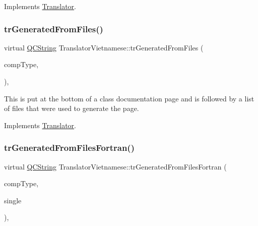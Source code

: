 Implements \mbox{\hyperlink{class_translator}{Translator}}.

\mbox{\label{class_translator_vietnamese_a410ae6f502f7025da6648e3f384e84bd}} 
\subsubsection{\texorpdfstring{trGeneratedFromFiles()}{trGeneratedFromFiles()}}
{\footnotesize\ttfamily virtual \mbox{\hyperlink{class_q_c_string}{Q\+C\+String}} Translator\+Vietnamese\+::tr\+Generated\+From\+Files (\begin{DoxyParamCaption}\item[{\mbox{\hyperlink{class_class_def_ae70cf86d35fe954a94c566fbcfc87939}{Class\+Def\+::\+Compound\+Type}}}]{comp\+Type,  }\item[{bool}]{ }\end{DoxyParamCaption})\hspace{0.3cm}{\ttfamily [inline]}, {\ttfamily [virtual]}}

This is put at the bottom of a class documentation page and is followed by a list of files that were used to generate the page. 

Implements \mbox{\hyperlink{class_translator}{Translator}}.

\mbox{\label{class_translator_vietnamese_a6d35ff7785c1a994ab25f81bc09ba5fe}} 
\subsubsection{\texorpdfstring{trGeneratedFromFilesFortran()}{trGeneratedFromFilesFortran()}}
{\footnotesize\ttfamily virtual \mbox{\hyperlink{class_q_c_string}{Q\+C\+String}} Translator\+Vietnamese\+::tr\+Generated\+From\+Files\+Fortran (\begin{DoxyParamCaption}\item[{\mbox{\hyperlink{class_class_def_ae70cf86d35fe954a94c566fbcfc87939}{Class\+Def\+::\+Compound\+Type}}}]{comp\+Type,  }\item[{bool}]{single }\end{DoxyParamCaption})\hspace{0.3cm}{\ttfamily [inline]}, {\ttfamily [virtual]}}

